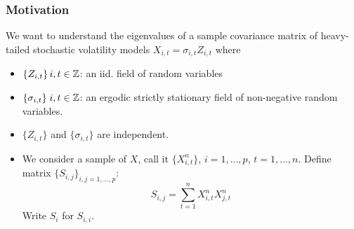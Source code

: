 \documentclass{beamer}
\begin{document}
\begin{frame}
  \frametitle{Motivation}
  We want to understand the eigenvalues of a sample covariance matrix
  of heavy-tailed stochastic volatility models
  $X_{i, t} = \sigma_{i, t} Z_{i,t}$ where
  \begin{itemize}
  \item $\{Z_{i,t}\}\, i,t \in \mathbb Z$: an iid. field of random variables
  \item $\{\sigma_{i,t}\}\; i,t \in \mathbb Z$: an ergodic strictly
    stationary field  of non-negative random variables.
  \item $\{Z_{i,t}\}$ and $\{\sigma_{i,t}\}$ are independent.
  \item We consider a sample of $X$, call it $\{X^n_{i, t}\}$,
    $i = 1, \dots, p$, $t = 1, \dots, n$. Define matrix
    $\{S_{i, j}\}_{i,j=1,\dots, p}$:
    \[
    S_{i,j} = \sum_{t=1}^n X^n_{i,t} X^n_{j, t}
    \]
    Write $S_i$ for $S_{i,i}$.
  \end{itemize}
\end{frame}
\end{document}
